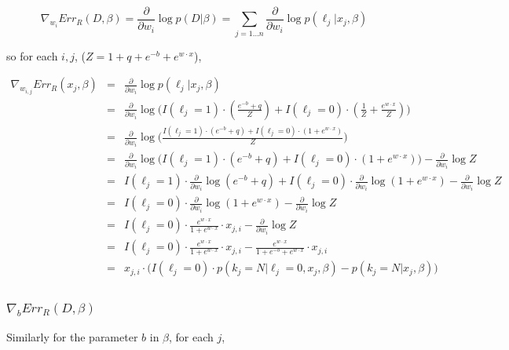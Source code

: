 \documentclass{article}
\begin{document}
$$
\nabla_{w_i}{Err_R (D, \beta)} = \frac{\partial}{\partial w_i} \log{p(D|\beta)} =  \sum_{j=1...n}{\frac{\partial}{\partial w_i}\log{p(\ell_j | x_j, \beta)}}
$$

so for each $i,j$, ($Z = 1 + q + e^{-b} + e^{w \cdot x}$),


\begin{eqnarray*}
\nabla_{w_{i,j}}{Err_R (x_j, \beta)} &=& \frac{\partial}{\partial w_i}\log{p(\ell_j | x_j, \beta)} \\
 &=& \frac{\partial}{\partial w_i}
		\log{\Bigg(
			I(\ell_j=1) \cdot \left( \frac{e^{-b} + q}{Z} \right) + 
			I(\ell_j=0) \cdot \left(\frac{1}{Z} + \frac{e^{w \cdot x}}{Z} \right)
		\Bigg)} \\
 &=& \frac{\partial}{\partial w_i}
		\log{\Bigg(
		    \frac{
			I(\ell_j=1) \cdot \left( e^{-b} + q \right) + 
			I(\ell_j=0) \cdot \left(1 + e^{w \cdot x} \right)
		     }{Z}
		\Bigg)} \\
 &=& \frac{\partial}{\partial w_i}
		\log{\bigg(
			I(\ell_j=1) \cdot \left( e^{-b} + q \right) +
			I(\ell_j=0) \cdot \left( 1 + e^{w \cdot x} \right)
		\bigg)}
		- \frac{\partial}{\partial w_i}
		 \log{Z} \\
 &=& I(\ell_j=1) \cdot \frac{\partial}{\partial w_i}
		\log{(e^{-b} + q)} +
    I(\ell_j=0) \cdot \frac{\partial}{\partial w_i}
		\log{ \left( 1 + e^{w \cdot x} \right) }
		- \frac{\partial}{\partial w_i}
		 \log{Z} \\
 &=& I(\ell_j=0) \cdot \frac{\partial}{\partial w_i}
		\log{  \left( 1 + e^{w \cdot x} \right) }
		- \frac{\partial}{\partial w_i}
		 \log{Z} \\
 &=& I(\ell_j=0) \cdot 
 		\frac{
			e^{w \cdot x}
		}{
			1 + e^{w \cdot x}
		} \cdot x_{j,i}
		- \frac{\partial}{\partial w_i}
		 \log{Z} \\
 &=& I(\ell_j=0) \cdot 
 		\frac{
			e^{w \cdot x}
		}{
			1 + e^{w \cdot x}
		} \cdot x_{j,i}
		- \frac{e^{w \cdot x}}{
			1 + e^{-b} + e^{w \cdot x}
		} \cdot x_{j,i} \\
 &=& x_{j,i} \cdot
    \big(	I(\ell_j=0) \cdot p(k_j=N | \ell_j=0, x_j, \beta) - 
		p(k_j=N | x_j, \beta)
    \big) \\
\end{eqnarray*}

\subsubsection{$ \nabla_{b}{Err_R (D, \beta)}$}

Similarly for the parameter $b$ in $\beta$, for each $j$,
\end{document}
